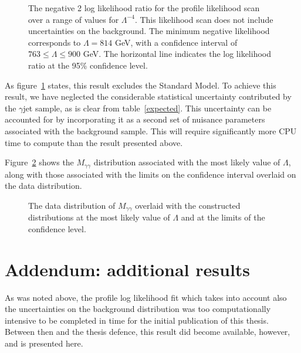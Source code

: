 \begin{figure}[htp]
\begin{minipage}[b]{.69\textwidth}
\begin{infilsf} \tiny

\end{infilsf}
\end{minipage}
\begin{minipage}[b]{.3\textwidth}
\caption{The negative 2 log likelihood ratio for the profile likelihood scan over a range of values for $\Lambda^{-4}$. This likelihood scan does not include uncertainties on the background. The minimum negative likelihood corresponds to $\Lambda=814$ GeV, with a confidence interval of $763 \le \Lambda \le 900$ GeV. The horizontal line indicates the log likelihood ratio at the 95\% confidence level.}\label{resllr}
\end{minipage}
\end{figure}

As figure~\ref{resllr} states, this result excludes the Standard Model. To achieve this result, we have neglected the considerable statistical uncertainty contributed by the $\gamma$jet sample, as is clear from table~\ref{expected}. This uncertainty can be accounted for by incorporating it as a second set of nuisance parameters associated with the background sample. This will require significantly more CPU time to compute than the result presented above.

Figure~\ref{result} shows the $M_{\gamma\gamma}$ distribution associated with the most likely value of $\Lambda$, along with those associated with the limits on the confidence interval overlaid on the data distribution.

\begin{figure}[htp]
\begin{minipage}[b]{.69\textwidth}
\begin{infilsf} \tiny

\end{infilsf}
\end{minipage}
\begin{minipage}[b]{.3\textwidth}
\caption{The data distribution of $M_{\gamma\gamma}$ overlaid with the constructed distributions at the most likely value of $\Lambda$ and at the limits of the confidence level.}\label{result}
\end{minipage}
\end{figure}

\section{Addendum: additional results}
As was noted above, the profile log likelihood fit which takes into account also the uncertainties on the background distribution was too computationally intensive to be completed in time for the initial publication of this thesis. Between then and the thesis defence, this result did become available, however, and is presented here.

